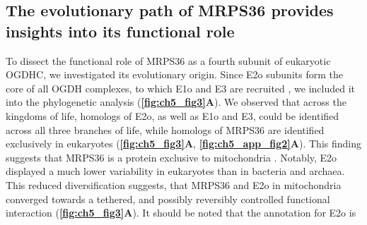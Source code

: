 \subsection*{The evolutionary path of MRPS36 provides insights into its functional role}
To dissect the functional role of MRPS36 as a fourth subunit of eukaryotic OGDHC, we investigated its evolutionary origin. Since E2o subunits form the core of all OGDH complexes, to which E1o and E3 are recruited \cite{Nemeria_2021}, we included it into the phylogenetic analysis (\textbf{\autoref{fig:ch5_fig3}A}). We observed that across the kingdoms of life, homologs of E2o, as well as E1o and E3, could be identified across all three branches of life, while homologs of MRPS36 are identified exclusively in eukaryotes (\textbf{\autoref{fig:ch5_fig3}A}, \textbf{\autoref{fig:ch5_app_fig2}A}). This finding suggests that MRPS36 is a protein exclusive to mitochondria \cite{Gray_2015}. Notably, E2o displayed a much lower variability in eukaryotes than in bacteria and archaea. This reduced diversification suggests, that MRPS36 and E2o in mitochondria converged towards a tethered, and possibly reversibly controlled functional interaction (\textbf{\autoref{fig:ch5_fig3}A}). It should be noted that the annotation for E2o is 

